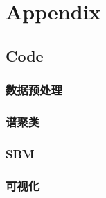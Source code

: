 \section{Appendix}

\subsection{Code}
\subsubsection{数据预处理}





\subsubsection{谱聚类}

\subsubsection{SBM}


\subsubsection{可视化}


